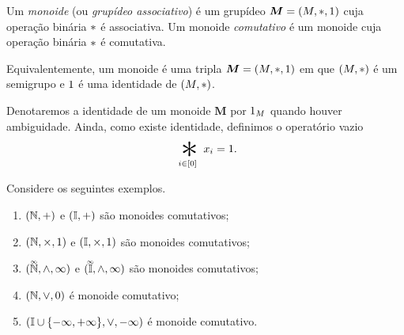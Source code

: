 \begin{definition}
Um \emph{monoide} (ou \emph{grupídeo associativo}) é um grupídeo $\bm M=(M,\ast,1)$ cuja operação binária $\ast$ é associativa. Um monoide \emph{comutativo} é um monoide cuja operação binária $\ast$ é comutativa.
\end{definition}

Equivalentemente, um monoide é uma tripla $\bm M=(M,\ast,1)$ em que $(M,\ast)$ é um semigrupo e $1$ é uma identidade de $(M,\ast)$.

\begin{notation}
Denotaremos a identidade de um monoide $\bm M$ por $1_M$ quando houver ambiguidade. Ainda, como existe identidade, definimos o operatório vazio
	\begin{equation*}
	\bigopb_{i \in [0]} x_i = \id.
	\end{equation*}
\end{notation}

\begin{example}
Considere os seguintes exemplos.
	\begin{enumerate}
	\item $(\mathbb{N},+)$ e $(\mathbb{I},+)$ são monoides comutativos;
	\item $(\mathbb{N},\times,1)$ e $(\mathbb{I},\times,1)$ são monoides comutativos;
	\item $(\accentset{\infty}{\mathbb{N}},\mathbin{\wedge},\infty)$ e $(\accentset{\infty}{\mathbb{I}},\mathbin{\wedge},\infty)$ são monoides comutativos;
	\item $(\mathbb{N},\mathbin{\vee},0)$ é monoide comutativo;
	\item $(\mathbb{I} \cup \{-\infty,+\infty\},\mathbin{\vee},-\infty)$ é monoide comutativo.
	\end{enumerate}
\end{example}




